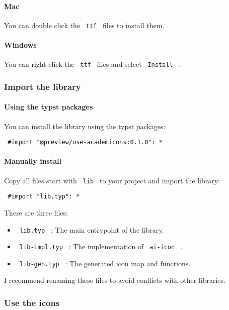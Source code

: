 \paragraph{Mac}\label{mac}

You can double click the \texttt{\ ttf\ } files to install them.

\paragraph{Windows}\label{windows}

You can right-click the \texttt{\ ttf\ } files and select
\texttt{\ Install\ } .

\subsubsection{Import the library}\label{import-the-library}

\paragraph{Using the typst packages}\label{using-the-typst-packages}

You can install the library using the typst packages:

\texttt{\ \#import\ "@preview/use-academicons:0.1.0":\ *\ }

\paragraph{Manually install}\label{manually-install}

Copy all files start with \texttt{\ lib\ } to your project and import
the library:

\texttt{\ \#import\ "lib.typ":\ *\ }

There are three files:

\begin{itemize}
\tightlist
\item
  \texttt{\ lib.typ\ } : The main entrypoint of the library.
\item
  \texttt{\ lib-impl.typ\ } : The implementation of \texttt{\ ai-icon\ }
  .
\item
  \texttt{\ lib-gen.typ\ } : The generated icon map and functions.
\end{itemize}

I recommend renaming these files to avoid conflicts with other
libraries.

\subsubsection{Use the icons}\label{use-the-icons}

